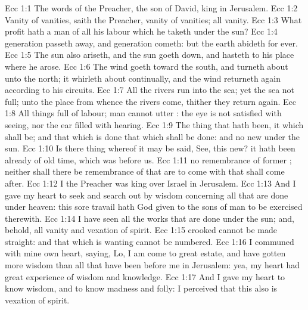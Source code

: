\vs Ecc 1:1 The words of the Preacher, the son of David, king in Jerusalem.
\vs Ecc 1:2 Vanity of vanities, saith the Preacher, vanity of vanities; all  vanity.
\vs Ecc 1:3 What profit hath a man of all his labour which he taketh under the sun?
\vs Ecc 1:4  generation passeth away, and  generation cometh: but the earth abideth for ever.
\vs Ecc 1:5 The sun also ariseth, and the sun goeth down, and hasteth to his place where he arose.
\vs Ecc 1:6 The wind goeth toward the south, and turneth about unto the north; it whirleth about continually, and the wind returneth again according to his circuits.
\vs Ecc 1:7 All the rivers run into the sea; yet the sea  not full; unto the place from whence the rivers come, thither they return again.
\vs Ecc 1:8 All things  full of labour; man cannot utter : the eye is not satisfied with seeing, nor the ear filled with hearing.
\vs Ecc 1:9 The thing that hath been, it  which shall be; and that which is done  that which shall be done: and  no new  under the sun.
\vs Ecc 1:10 Is there  thing whereof it may be said, See, this  new? it hath been already of old time, which was before us.
\vs Ecc 1:11  no remembrance of former ; neither shall there be  remembrance of  that are to come with  that shall come after.
\vs Ecc 1:12 I the Preacher was king over Israel in Jerusalem.
\vs Ecc 1:13 And I gave my heart to seek and search out by wisdom concerning all  that are done under heaven: this sore travail hath God given to the sons of man to be exercised therewith.
\vs Ecc 1:14 I have seen all the works that are done under the sun; and, behold, all  vanity and vexation of spirit.
\vs Ecc 1:15  crooked cannot be made straight: and that which is wanting cannot be numbered.
\vs Ecc 1:16 I communed with mine own heart, saying, Lo, I am come to great estate, and have gotten more wisdom than all  that have been before me in Jerusalem: yea, my heart had great experience of wisdom and knowledge.
\vs Ecc 1:17 And I gave my heart to know wisdom, and to know madness and folly: I perceived that this also is vexation of spirit.
